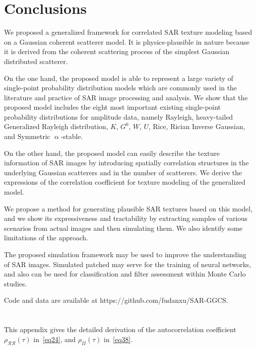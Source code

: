 \documentclass[journal]{IEEEtran}
\begin{document}
\section{Conclusions}\label{Sec:Conclusions}

We proposed a generalized framework for correlated SAR texture modeling based on a Gaussian coherent scatterer model.
It is physics-plausible in nature because it is derived from the coherent scattering process of the simplest Gaussian distributed scatterer.

On the one hand, the proposed model is able to represent a large variety of single-point probability distribution models which are commonly used in the literature and practice of SAR image processing and analysis.
We show that the proposed model includes the eight most important existing single-point probability distributions for amplitude data, namely
Rayleigh,
heavy-tailed Generalized Rayleigh distribution,
$K$,
$G^0$,
$W$,
$U$,
Rice,
Rician Inverse Gaussian, and
Symmetric $\upalpha$-stable.

On the other hand, the proposed model can easily describe the texture information of SAR images by introducing spatially correlation structures in the underlying Gaussian scatterers and in the number of scatterers.
We derive the expressions of the correlation coefficient for texture modeling of the generalized model.

We propose a method for generating plausible SAR textures based on this model, and we show its expressiveness and tractability by extracting samples of various scenarios from actual images and then simulating them.
We also identify some limitations of the approach.

The proposed simulation framework may be used to improve the understanding of SAR images.
Simulated patched may serve for the training of neural networks, and also can be used for classification and filter assessment within Monte Carlo studies.

Code and data are available at https://github.com/fudanxu/SAR-GGCS.

\section{}

This appendix gives the detailed derivation of the autocorrelation coefficient $\rho_{\mathcal{R} \mathcal{R}}(\tau)$ in~\eqref{eq24}, and $\rho_{I I}(\tau)$ in~\eqref{eq38}.
\setcounter{equation}{0}
\renewcommand\theequation{A.\arabic{equation}}
\end{document}
